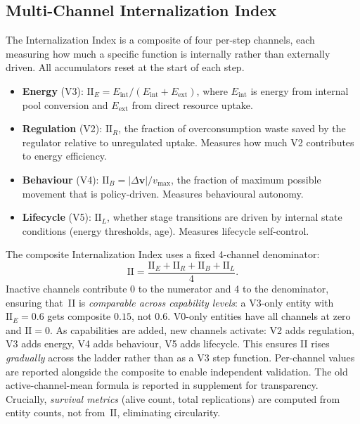 \documentclass[letterpaper]{article}
\begin{document}
\subsection{Multi-Channel Internalization Index}

The Internalization Index is a composite of four per-step channels, each
measuring how much a specific function is internally rather than externally
driven.
All accumulators reset at the start of each step.

\begin{itemize}
\item \textbf{Energy} (V3): $\mathrm{II}_E = E_\text{int}/(E_\text{int}+E_\text{ext})$,
  where $E_\text{int}$ is energy from internal pool conversion and
  $E_\text{ext}$ from direct resource uptake.
\item \textbf{Regulation} (V2): $\mathrm{II}_R$, the fraction of
  overconsumption waste saved by the regulator relative to unregulated
  uptake.
  Measures how much V2 contributes to energy efficiency.
\item \textbf{Behaviour} (V4): $\mathrm{II}_B = |\Delta\mathbf{v}|/v_\text{max}$,
  the fraction of maximum possible movement that is policy-driven.
  Measures behavioural autonomy.
\item \textbf{Lifecycle} (V5): $\mathrm{II}_L$, whether stage transitions
  are driven by internal state conditions (energy thresholds, age).
  Measures lifecycle self-control.
\end{itemize}

The composite Internalization Index uses a fixed 4-channel denominator:
\begin{equation}
  \mathrm{II} = \frac{\mathrm{II}_E + \mathrm{II}_R + \mathrm{II}_B + \mathrm{II}_L}{4}.
  \label{eq:ii}
\end{equation}
Inactive channels contribute 0 to the numerator and 4 to the denominator,
ensuring that~II is \emph{comparable across capability levels}: a V3-only
entity with $\mathrm{II}_E\!=\!0.6$ gets composite $0.15$, not $0.6$.
V0-only entities have all channels at zero and $\mathrm{II}=0$.
As capabilities are added, new channels activate: V2 adds regulation,
V3 adds energy, V4 adds behaviour, V5 adds lifecycle.
This ensures II rises \emph{gradually} across the ladder rather than as a
V3 step function.
Per-channel values are reported alongside the composite to enable
independent validation.
The old active-channel-mean formula is reported in supplement for
transparency.
Crucially, \emph{survival metrics} (alive count, total replications) are
computed from entity counts, not from~$\mathrm{II}$, eliminating circularity.
\end{document}
